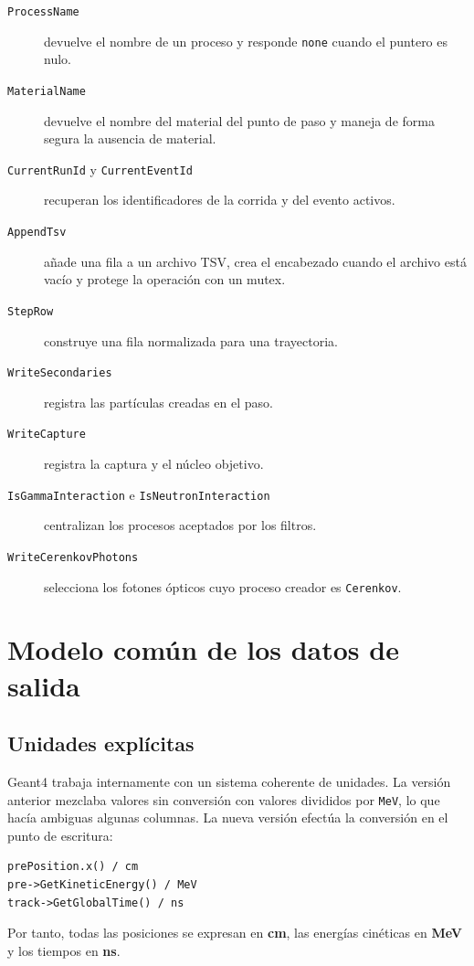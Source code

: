 \documentclass[11pt,a4paper]{article}
\newcommand{\codigo}[1]{\nolinkurl{#1}}
\begin{document}
\begin{description}
  \item[\codigo{ProcessName}] devuelve el nombre de un proceso y responde
  \codigo{none} cuando el puntero es nulo.
  \item[\codigo{MaterialName}] devuelve el nombre del material del punto de
  paso y maneja de forma segura la ausencia de material.
  \item[\codigo{CurrentRunId} y \codigo{CurrentEventId}] recuperan los
  identificadores de la corrida y del evento activos.
  \item[\codigo{AppendTsv}] añade una fila a un archivo TSV, crea el encabezado
  cuando el archivo está vacío y protege la operación con un mutex.
  \item[\codigo{StepRow}] construye una fila normalizada para una trayectoria.
  \item[\codigo{WriteSecondaries}] registra las partículas creadas en el paso.
  \item[\codigo{WriteCapture}] registra la captura y el núcleo objetivo.
  \item[\codigo{IsGammaInteraction} e \codigo{IsNeutronInteraction}]
  centralizan los procesos aceptados por los filtros.
  \item[\codigo{WriteCerenkovPhotons}] selecciona los fotones ópticos cuyo
  proceso creador es \codigo{Cerenkov}.
\end{description}

\section{Modelo común de los datos de salida}

\subsection{Unidades explícitas}

Geant4 trabaja internamente con un sistema coherente de unidades. La versión
anterior mezclaba valores sin conversión con valores divididos por
\codigo{MeV}, lo que hacía ambiguas algunas columnas. La nueva versión efectúa
la conversión en el punto de escritura:

\begin{lstlisting}
prePosition.x() / cm
pre->GetKineticEnergy() / MeV
track->GetGlobalTime() / ns
\end{lstlisting}

Por tanto, todas las posiciones se expresan en \textbf{cm}, las energías
cinéticas en \textbf{MeV} y los tiempos en \textbf{ns}.
\end{document}
